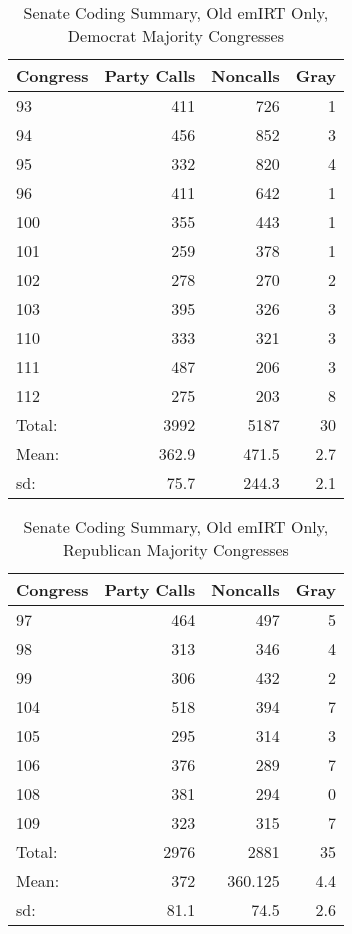 \documentclass[12pt]{article}
\begin{document}
\begin{table}[ht]
	\caption{Senate Coding Summary, Old emIRT Only, Democrat Majority Congresses}
	\centering
	\begin{tabular}{lrrr}
		\hline
		Congress & Party Calls & Noncalls & Gray \\ 
		\hline
		93 & 411 & 726 &   1 \\ 
		94 & 456 & 852 &   3 \\ 
		95 & 332 & 820 &   4 \\ 
		96 & 411 & 642 &   1 \\ 
		100 & 355 & 443 &   1 \\ 
		101 & 259 & 378 &   1 \\ 
		102 & 278 & 270 &   2 \\ 
		103 & 395 & 326 &   3 \\ 
		110 & 333 & 321 &   3 \\ 
		111 & 487 & 206 &   3 \\ 
		112 & 275 & 203 &   8 \\ 
		\hline
		Total: & 3992 & 5187 & 30 \\
		Mean: & 362.9 & 471.5 & 2.7 \\
		sd: & 75.7 & 244.3 & 2.1 \\
		\hline
	\end{tabular}
\end{table}

\begin{table}[ht]
	\caption{Senate Coding Summary, Old emIRT Only, Republican Majority Congresses}
	\centering
	\begin{tabular}{lrrr}
		\hline
		Congress & Party Calls & Noncalls & Gray \\ 
		\hline
		97 & 464 & 497 &   5 \\ 
		98 & 313 & 346 &   4 \\ 
		99 & 306 & 432 &   2 \\ 
		104 & 518 & 394 &   7 \\ 
		105 & 295 & 314 &   3 \\ 
		106 & 376 & 289 &   7 \\ 
		108 & 381 & 294 &   0 \\ 
		109 & 323 & 315 &   7 \\ 
		\hline
		Total: & 2976 & 2881 & 35 \\
		Mean: & 372 & 360.125 & 4.4 \\
		sd: & 81.1 & 74.5 & 2.6 \\
		\hline
	\end{tabular}
\end{table}
\end{document}
